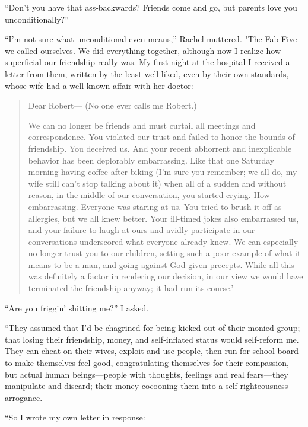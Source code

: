 ``Don't you have that ass-backwards? Friends come and go, but parents
love you unconditionally?''

``I'm not sure what unconditional even means,'' Rachel muttered. "The
Fab Five we called ourselves. We did everything together, although now I
realize how superficial our friendship really was. My first night at the
hospital I received a letter from them, written by the least-well liked,
even by their own standards, whose wife had a well-known affair with her
doctor:

\begin{quote}
Dear Robert--- (No one ever calls me Robert.)

We can no longer be friends and must curtail all meetings and
correspondence. You violated our trust and failed to honor the bounds of
friendship. You deceived us. And your recent abhorrent and inexplicable
behavior has been deplorably embarrassing. Like that one Saturday
morning having coffee after biking (I'm sure you remember; we all do, my
wife still can't stop talking about it) when all of a sudden and without
reason, in the middle of our conversation, you started crying. How
embarrassing. Everyone was staring at us. You tried to brush it off as
allergies, but we all knew better. Your ill-timed jokes also embarrassed
us, and your failure to laugh at ours and avidly participate in our
conversations underscored what everyone already knew. We can especially
no longer trust you to our children, setting such a poor example of what
it means to be a man, and going against God-given precepts. While all
this was definitely a factor in rendering our decision, in our view we
would have terminated the friendship anyway; it had run its course.'
\end{quote}

\noindent ``Are you friggin' shitting me?'' I asked.

``They assumed that I'd be chagrined for being kicked out of their monied
group; that losing their friendship, money, and self-inflated status
would self-reform me. They can cheat on their wives, exploit and use
people, then run for school board to make themselves feel good,
congratulating themselves for their compassion, but actual human
beings---people with thoughts, feelings and real fears---they manipulate
and discard; their money cocooning them into a self-righteousness
arrogance.

``So I wrote my own letter in response:

